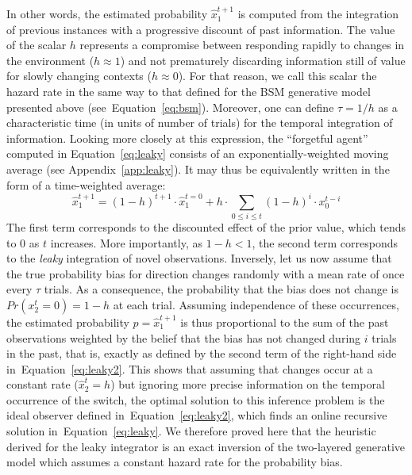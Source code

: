 \documentclass[10pt,letterpaper]{article}
\newcommand{\eql}[1]{\begin{equation}#1\end{equation}}
\newcommand{\seeEq}[1]{Equation~\ref{eq:#1}}
\newcommand{\seeApp}[1]{Appendix~\ref{app:#1}}
\begin{document}
In other words, the estimated probability $\hat{x}_1^{t+1}$ is computed
from the integration of previous instances
with a progressive discount of past information.
The value of the scalar $h$ represents
a compromise between responding rapidly
to changes in the environment ($h \approx 1$) and
not prematurely discarding information still of value
for slowly changing contexts  ($h \approx 0$).
For that reason, we call this scalar the hazard rate
in the same way to that defined for the BSM generative model presented above (see~\seeEq{bsm}).
Moreover, one can define $\tau = 1 / h$ as
a characteristic time (in units of number of trials)
for the temporal integration of information.
Looking more closely at this expression,
the ``forgetful agent'' computed in \seeEq{leaky}
consists of an exponentially-weighted moving average (see \seeApp{leaky}).
It may thus be equivalently written in the form of a time-weighted average:
\eql{
\hat{x}_1^{t+1} = (1-h)^{t+1} \cdot \hat{x}_1^{t=0} + h \cdot \sum_{0\leq i \leq t} (1 - h)^{i} \cdot x_0^{t-i}
\label{eq:leaky2}}
The first term corresponds to the discounted effect of the prior value,
which tends to $0$ as $t$ increases.
More importantly, as $1-h < 1$, the second term corresponds to the \emph{leaky} integration of novel observations.
Inversely, let us now assume that
the true probability bias for direction changes randomly with a mean rate of once
every $\tau$ trials.
As a consequence, the probability that the bias does not change is $Pr(x_2^t=0)=1-h$ at each trial.
Assuming independence of these occurrences, the estimated probability $p=\hat{x}_1^{t+1}$ is thus proportional to the sum
of the past observations weighted by the belief that the bias has not changed during $i$ trials in the past, that is, exactly as defined by the second term of the right-hand side in~\seeEq{leaky2}.
This shows that assuming that changes occur at a constant rate ($\hat{x}_2^t=h$)
but ignoring more precise information on the temporal occurrence of the switch,
the optimal solution to this inference problem is the
ideal observer defined in~\seeEq{leaky2},
which finds an online recursive solution in~\seeEq{leaky}.
We therefore proved here that the heuristic derived for the leaky integrator
is an exact inversion of the two-layered generative model
which assumes a constant hazard rate for the probability bias.
\end{document}
